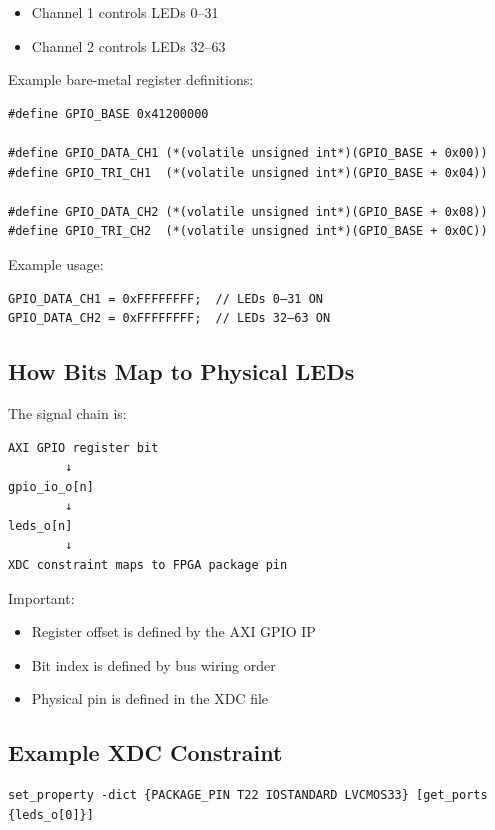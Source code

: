 \begin{itemize}
    \item Channel 1 controls LEDs 0--31
    \item Channel 2 controls LEDs 32--63
\end{itemize}

Example bare-metal register definitions:

\begin{verbatim}
#define GPIO_BASE 0x41200000

#define GPIO_DATA_CH1 (*(volatile unsigned int*)(GPIO_BASE + 0x00))
#define GPIO_TRI_CH1  (*(volatile unsigned int*)(GPIO_BASE + 0x04))

#define GPIO_DATA_CH2 (*(volatile unsigned int*)(GPIO_BASE + 0x08))
#define GPIO_TRI_CH2  (*(volatile unsigned int*)(GPIO_BASE + 0x0C))
\end{verbatim}

Example usage:

\begin{verbatim}
GPIO_DATA_CH1 = 0xFFFFFFFF;  // LEDs 0–31 ON
GPIO_DATA_CH2 = 0xFFFFFFFF;  // LEDs 32–63 ON
\end{verbatim}

\subsection{How Bits Map to Physical LEDs}

The signal chain is:

\begin{verbatim}
AXI GPIO register bit
        ↓
gpio_io_o[n]
        ↓
leds_o[n]
        ↓
XDC constraint maps to FPGA package pin
\end{verbatim}

Important:

\begin{itemize}
    \item Register offset is defined by the AXI GPIO IP
    \item Bit index is defined by bus wiring order
    \item Physical pin is defined in the XDC file
\end{itemize}

\subsection{Example XDC Constraint}

\begin{verbatim}
set_property -dict {PACKAGE_PIN T22 IOSTANDARD LVCMOS33} [get_ports {leds_o[0]}]
\end{verbatim}

